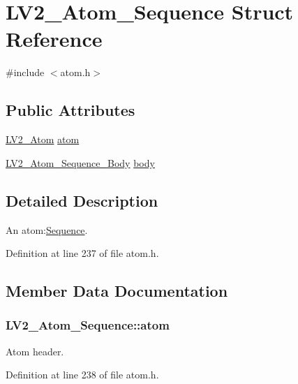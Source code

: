 \hypertarget{struct_l_v2___atom___sequence}{}\section{L\+V2\+\_\+\+Atom\+\_\+\+Sequence Struct Reference}
\label{struct_l_v2___atom___sequence}


{\ttfamily \#include $<$atom.\+h$>$}

\subsection*{Public Attributes}
\begin{DoxyCompactItemize}
\item 
\hyperlink{struct_l_v2___atom}{L\+V2\+\_\+\+Atom} \hyperlink{struct_l_v2___atom___sequence_a0e2e9e2e38a6a6d918f05f322ee567ee}{atom}
\item 
\hyperlink{struct_l_v2___atom___sequence___body}{L\+V2\+\_\+\+Atom\+\_\+\+Sequence\+\_\+\+Body} \hyperlink{struct_l_v2___atom___sequence_ab676c64fc85280dea192e5d879b1b9b2}{body}
\end{DoxyCompactItemize}


\subsection{Detailed Description}
An atom\+:\hyperlink{class_sequence}{Sequence}. 

Definition at line 237 of file atom.\+h.



\subsection{Member Data Documentation}
\subsubsection[{\texorpdfstring{atom}{atom}}]{ L\+V2\+\_\+\+Atom\+\_\+\+Sequence\+::atom}\hypertarget{struct_l_v2___atom___sequence_a0e2e9e2e38a6a6d918f05f322ee567ee}{}\label{struct_l_v2___atom___sequence_a0e2e9e2e38a6a6d918f05f322ee567ee}
Atom header. 

Definition at line 238 of file atom.\+h.

